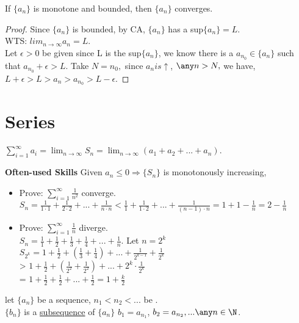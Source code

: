 \begin{theorem}
    If $\{a_n\}$ is monotone and bounded, then $\{a_n\}$ converges.
\end{theorem}
\begin{proof}
    Since $\{a_n\}$ is bounded, by CA, $\{a_n\}$ has a sup$\{a_n\}=L$.\\
    WTS: $lim_{n\to\infty} a_n = L$.\\
    Let $\epsilon >0$ be given since L is the sup$\{a_n\}$, we know there is a $a_{n_0} \in \{a_n\}$ such that $a_{n_0} + \epsilon > L$. Take $N=n_0,$ since $a_n is \uparrow$, $\any n >N,$ we have, $L+\epsilon > L >a_n > a_{n_0} > L - \epsilon$.
\end{proof}

\section{Series}
\begin{definition}[Series]
    $\sum_{i=1}^{\infty} a_i = \lim_{n\to\infty} S_n = \lim_{n\to\infty} (a_1 + a_2 +...+a_n)$.
\end{definition}

\noindent \textbf{Often-used Skills}
Given $a_n \leq 0 \Rightarrow \{ S_n\} $ is monotonously increasing,
\begin{itemize}
    \item Prove: $\sum_{i=1}^{\infty} \frac{1}{n^2}$ converge. \\
    $S_n = \frac{1}{1\cdot 1} + \frac{1}{2\cdot2} +...+ \frac{1}{n\cdot n} < \frac{1}{1} + \frac{1}{1\cdot 2} + ...+ \frac{1}{(n-1)\cdot n} = 1 + 1 - \frac{1}{n} = 2 - \frac{1}{n}$
    \item Prove: 
    $\sum_{i=1}^{\infty} \frac{1}{n}$ diverge. \\
    $S_n = \frac{1}{1} + \frac{1}{2} + \frac{1}{3} + \frac{1}{4} +...+ \frac{1}{n}$. Let $n=2^k$\\
    $S_{2^k} = 1 + \frac{1}{2} + (\frac{1}{3}+\frac{1}{4})+...+\frac{1}{2^{k-1}}+\frac{1}{2^k}$\\
    > $1+\frac{1}{2}+(\frac{1}{2^2}+\frac{1}{2^2})+...+2^k \cdot \frac{1}{2^k}$\\
    = $1+\frac{1}{2}+\frac{1}{2}+...+\frac{1}{2} = 1+\frac{k}{2}$
\end{itemize}
\begin{definition}
    let $\{a_n\}$ be a sequence, $n_1 < n_2 <...$ be .\\
    $\{b_n\}$ is a \uline{subsequence} of $\{a_n\}$ \iff $b_1 = a_{n_1}$, $b_2 = a_{n_2}, ... \any n \in \N$.
\end{definition}

